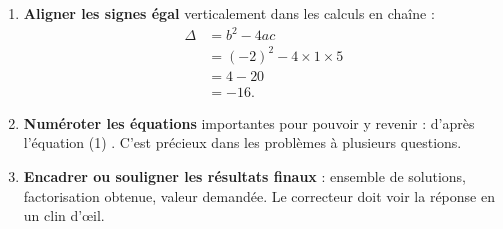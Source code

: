 \documentclass[11pt]{article}
\begin{document}
\begin{enumerate}
\item \textbf{Aligner les signes égal} verticalement dans les calculs en chaîne :
\begin{align*}
\Delta &= b^2-4ac\\
&= (-2)^2-4\times 1\times 5\\
&= 4-20\\
&= -16.
\end{align*}
\item \textbf{Numéroter les équations} importantes pour pouvoir y revenir : \og d'après l'équation (1) \fg. C'est précieux dans les problèmes à plusieurs questions.
\item \textbf{Encadrer ou souligner les résultats finaux} : ensemble de solutions, factorisation obtenue, valeur demandée. Le correcteur doit voir la réponse en un clin d'œil.
\end{enumerate}
\end{document}
